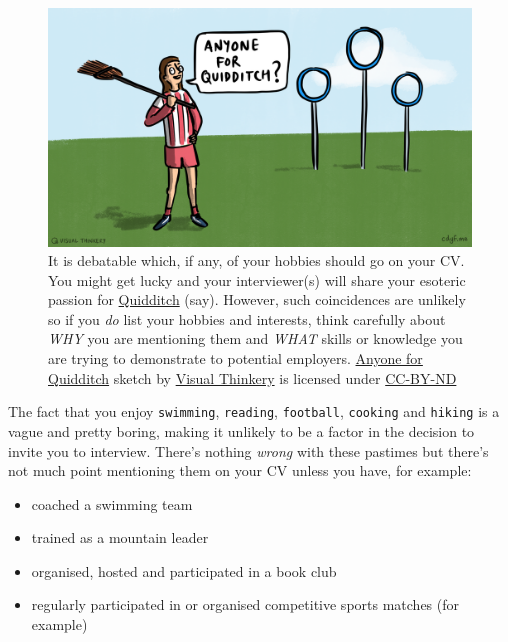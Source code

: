 \documentclass[
]{book}
\providecommand{\tightlist}{%
  \setlength{\itemsep}{0pt}\setlength{\parskip}{0pt}}
\begin{document}
\begin{figure}

{\centering \includegraphics[width=0.98\linewidth]{images/Anyone for quidditch} 

}

\caption{It is debatable which, if any, of your hobbies should go on your CV. You might get lucky and your interviewer(s) will share your esoteric passion for \href{https://en.wikipedia.org/wiki/Quidditch_(real-life_sport)}{Quidditch} (say). \citep{quidditch} However, such coincidences are unlikely so if you \emph{do} list your hobbies and interests, think carefully about \emph{WHY} you are mentioning them and \emph{WHAT} skills or knowledge you are trying to demonstrate to potential employers. \href{https://en.wikipedia.org/wiki/Anyone_for_tennis\%3F}{Anyone for Quidditch} sketch by \href{https://visualthinkery.com/}{Visual Thinkery} is licensed under \href{https://creativecommons.org/licenses/by-nd/4.0/}{CC-BY-ND}}\label{fig:quidditch-fig}
\end{figure}



The fact that you enjoy \texttt{swimming}, \texttt{reading}, \texttt{football}, \texttt{cooking} and \texttt{hiking} is a vague and pretty boring, making it unlikely to be a factor in the decision to invite you to interview. There's nothing \emph{wrong} with these pastimes but there's not much point mentioning them on your CV unless you have, for example:

\begin{itemize}
\tightlist
\item
  coached a swimming team
\item
  trained as a mountain leader
\item
  organised, hosted and participated in a book club
\item
  regularly participated in or organised competitive sports matches (for example)
\end{itemize}
\end{document}
